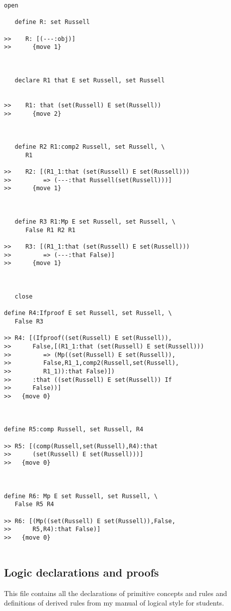 \begin{verbatim}
open

   define R: set Russell

>>    R: [(---:obj)]
>>      {move 1}



   declare R1 that E set Russell, set Russell


>>    R1: that (set(Russell) E set(Russell))
>>      {move 2}



   define R2 R1:comp2 Russell, set Russell, \
      R1

>>    R2: [(R1_1:that (set(Russell) E set(Russell)))
>>         => (---:that Russell(set(Russell)))]
>>      {move 1}



   define R3 R1:Mp E set Russell, set Russell, \
      False R1 R2 R1

>>    R3: [(R1_1:that (set(Russell) E set(Russell)))
>>         => (---:that False)]
>>      {move 1}



   close

define R4:Ifproof E set Russell, set Russell, \
   False R3

>> R4: [(Ifproof((set(Russell) E set(Russell)),
>>      False,[(R1_1:that (set(Russell) E set(Russell)))
>>         => (Mp((set(Russell) E set(Russell)),
>>         False,R1_1,comp2(Russell,set(Russell),
>>         R1_1)):that False)])
>>      :that ((set(Russell) E set(Russell)) If
>>      False))]
>>   {move 0}



define R5:comp Russell, set Russell, R4

>> R5: [(comp(Russell,set(Russell),R4):that
>>      (set(Russell) E set(Russell)))]
>>   {move 0}



define R6: Mp E set Russell, set Russell, \
   False R5 R4

>> R6: [(Mp((set(Russell) E set(Russell)),False,
>>      R5,R4):that False)]
>>   {move 0}


\end{verbatim}

\subsection{Logic declarations and proofs}

This file contains all the declarations of primitive concepts and rules and definitions of derived rules from my manual of logical style for students.

